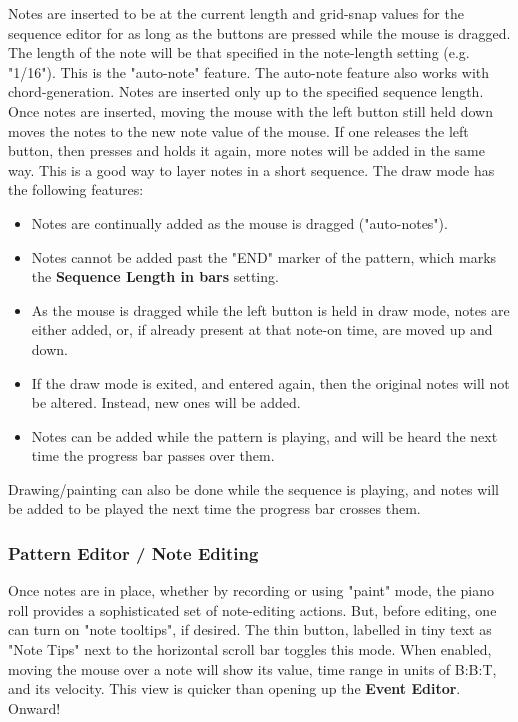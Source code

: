    Notes are inserted to be at the current length and grid-snap values for
   the sequence editor for as long as the buttons are pressed while the mouse
   is dragged.
   The length of the note will
   be that specified in the note-length setting (e.g. "1/16").
   This is the "auto-note" feature.
   The auto-note feature also works with chord-generation.
   Notes are inserted only up to the specified sequence length.
   Once notes are inserted, moving the mouse with the left button still
   held down moves the notes to the new note value of the mouse.
   If one releases the left button, then presses and holds it again,
   more notes will be added in the same way.
   This is a good way to layer notes in a short sequence.
   The draw mode has the following features:

   \begin{itemize}
      \item Notes are continually added as the mouse is dragged ("auto-notes").
      \item Notes cannot be added past the "END" marker of the pattern, which
         marks the \textbf{Sequence Length in bars} setting.
      \item As the mouse is dragged while the left button is held in draw mode,
         notes are either added, or, if already present at that note-on time,
         are moved up and down.
      \item If the draw mode is exited, and entered again, then the original
         notes will not be altered.  Instead, new ones will be added.
      \item Notes can be added while the pattern is playing, and will be heard
         the next time the progress bar passes over them.
   \end{itemize}

   Drawing/painting can also be done while the sequence is playing,
   and notes will be added to be played the next time the progress bar crosses
   them.

\subsubsection{Pattern Editor / Note Editing}
\label{subsubsec:pattern_editor_note_editing}

   Once notes are in place, whether by recording or using "paint" mode,
   the piano roll provides a sophisticated set of note-editing
   actions.
   But, before editing, one can turn on
   "note tooltips", if desired.
   The thin button, labelled in tiny text as "Note Tips"
   next to the horizontal scroll bar toggles this mode.
   When enabled, moving the mouse over a note will show its value, time range
   in units of B:B:T, and its velocity.
   This view is quicker than opening up the \textbf{Event Editor}.
   Onward!

